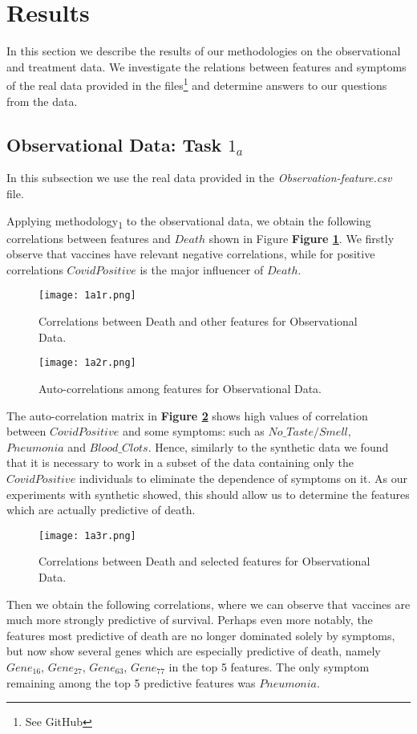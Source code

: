 \section{Results}
\label{sec:Results}
In this section we describe the results of our methodologies on the observational and treatment data. We investigate the relations between features and symptoms of the real data provided in the files\footnote{See GitHub} and determine answers to our questions from the data. 

\subsection{Observational Data: Task $1_a$}
\label{subsec:1_a_real}
\graphicspath{{pictures/task1a/}}
In this subsection we use the real data provided in the \textit{Observation-feature.csv} file. 

Applying methodology\textsubscript{1} to the observational data, we obtain the following correlations between features and $Death$ shown in Figure \textbf{Figure \ref{fig:1a1r}}. We firstly observe that vaccines have relevant negative correlations, while for positive correlations $CovidPositive$ is the major influencer of $Death$.

\begin{figure}[H]
  \texttt{[image: 1a1r.png]}
  \caption{Correlations between Death and other features for Observational Data.}
    \label{fig:1a1r}
\end{figure}

\begin{figure}[H]
  \texttt{[image: 1a2r.png]}
  \caption{Auto-correlations among features for Observational Data.}
  \label{fig:1a2r}
\end{figure}

The auto-correlation matrix in \textbf{Figure \ref{fig:1a2r}} shows high values of correlation between $CovidPositive$ and some symptoms: such as $No\_Taste/Smell$, $Pneumonia$ and $Blood\_Clots$. Hence, similarly to the synthetic data we found that it is necessary to work in a subset of the data containing only the $CovidPositive$ individuals to eliminate the dependence of symptoms on it. As our experiments with synthetic showed, this should allow us to determine the features which are actually predictive of death.

\begin{figure}[H]
  \texttt{[image: 1a3r.png]}
  \caption{Correlations between Death and selected features for Observational Data.}
    \label{fig:1a3r}
\end{figure}
Then we obtain the following correlations, where we can observe that vaccines are much more strongly predictive of survival. Perhaps even more notably, the features most predictive of death are no longer dominated solely by symptoms, but now show several genes which are especially predictive of death, namely $Gene_{16}$, $Gene_{27}$, $Gene_{63}$, $Gene_{77}$ in the top 5 features. The only symptom remaining among the top 5 predictive features was $Pneumonia$.

